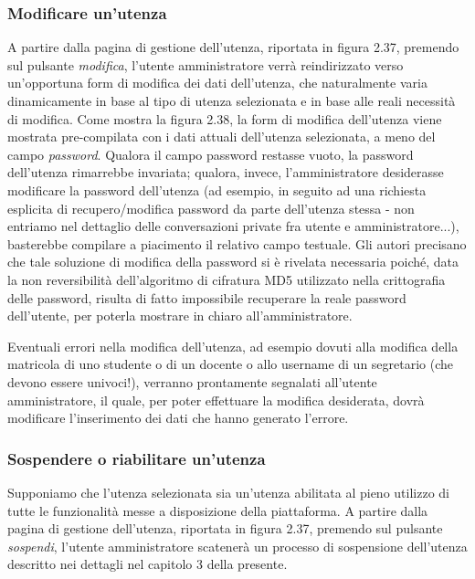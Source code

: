 \documentclass [a4paper,11pt]{book}
\begin{document}

\medskip

\subsubsection{Modificare un'utenza}

A partire dalla pagina di gestione dell'utenza, riportata in figura 2.37, premendo sul pulsante \emph{modifica}, l'utente amministratore verrà reindirizzato verso un'opportuna form di modifica dei dati dell'utenza, che naturalmente varia dinamicamente in base al tipo di utenza selezionata e in base alle reali necessità di modifica. Come mostra la figura 2.38, la form di modifica dell'utenza viene mostrata pre-compilata con i dati attuali dell'utenza selezionata, a meno del campo \emph{password}. Qualora il campo password restasse vuoto, la password dell'utenza rimarrebbe invariata; qualora, invece, l'amministratore desiderasse modificare la password dell'utenza (ad esempio, in seguito ad una richiesta esplicita di recupero/modifica password da parte dell'utenza stessa - non entriamo nel dettaglio delle conversazioni private fra utente e amministratore...), basterebbe compilare a piacimento il relativo campo testuale. Gli autori precisano che tale soluzione di modifica della password si è rivelata necessaria poiché, data la non reversibilità dell'algoritmo di cifratura MD5 utilizzato nella crittografia delle password, risulta di fatto impossibile recuperare la reale password dell'utente, per poterla mostrare in chiaro all'amministratore.


Eventuali errori nella modifica dell'utenza, ad esempio dovuti alla modifica della matricola di uno studente o di un docente o allo username di un segretario (che devono essere univoci!), verranno prontamente segnalati all'utente amministratore, il quale, per poter effettuare la modifica desiderata, dovrà modificare l'inserimento dei dati che hanno generato l'errore.

\medskip

\subsubsection{Sospendere o riabilitare un'utenza}

Supponiamo che l'utenza selezionata sia un'utenza abilitata al pieno utilizzo di tutte le funzionalità messe a disposizione della piattaforma. A partire dalla pagina di gestione dell'utenza, riportata in figura 2.37, premendo sul pulsante \emph{sospendi}, l'utente amministratore scatenerà un processo di sospensione dell'utenza descritto nei dettagli nel capitolo 3 della presente. 
\end{document}
